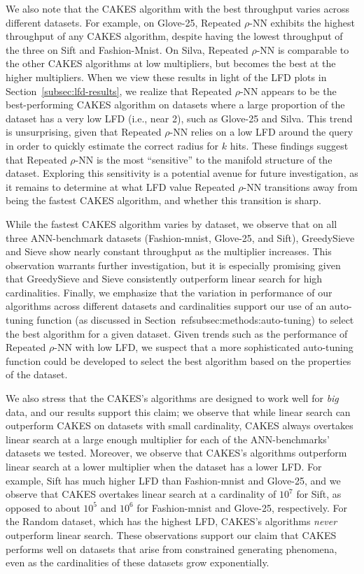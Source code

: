 We also note that the CAKES algorithm with the best throughput varies across different datasets.
For example, on Glove-25, Repeated $\rho$-NN exhibits the highest throughput of any CAKES algorithm, despite having the lowest throughput of the three on Sift and Fashion-Mnist. 
On Silva, Repeated $\rho$-NN is comparable to the other CAKES algorithms at low multipliers, but becomes the best at the higher multipliers. 
When we view these results in light of the LFD plots in Section~\ref{subsec:lfd-results}, we realize that  Repeated $\rho$-NN appears to be the best-performing CAKES algorithm on datasets where a large proportion of the dataset has a very low LFD (i.e., near 2), such as Glove-25 and Silva. 
This trend is unsurprising, given that Repeated $\rho$-NN relies on a low LFD around the query in order to quickly estimate the correct radius for $k$ hits. 
These findings suggest that Repeated $\rho$-NN is the most ``sensitive'' to the manifold structure of the dataset.
Exploring this sensitivity is a potential avenue for future investigation, as it remains to determine at what LFD value Repeated $\rho$-NN transitions away from being the fastest CAKES algorithm, and whether this transition is sharp.

While the fastest CAKES algorithm varies by dataset, we observe that on all three ANN-benchmark datasets (Fashion-mnist, Glove-25, and Sift), GreedySieve and Sieve show nearly constant throughput as the multiplier increases.
This observation warrants further investigation, but it is especially promising given that GreedySieve and Sieve consistently outperform linear search for high cardinalities.
Finally, we emphasize that the variation in performance of our algorithms across different datasets and cardinalities support our use of an auto-tuning function (as discussed in Section~ref{subsec:methods:auto-tuning}) to select the best algorithm for a given dataset.
Given trends such as the performance of Repeated $\rho$-NN with low LFD, we suspect that a more sophisticated auto-tuning function could be developed to select the best algorithm based on the properties of the dataset.

We also stress that the CAKES's algorithms are designed to work well for \emph{big} data, and our results support this claim;
we observe that while linear search can outperform CAKES on datasets with small cardinality, CAKES always overtakes linear search at a large enough multiplier for each of the ANN-benchmarks' datasets we tested.
Moreover, we observe that CAKES's algorithms outperform linear search at a lower multiplier when the dataset has a lower LFD.
For example, Sift has much higher LFD than Fashion-mnist and Glove-25, and we observe that CAKES overtakes linear search at a cardinality of $10^7$ for Sift, as opposed to about $10^5$ and $10^6$ for Fashion-mnist and Glove-25, respectively.
For the Random dataset, which has the highest LFD, CAKES's algorithms \emph{never} outperform linear search.
These observations support our claim that CAKES performs well on datasets that arise from constrained generating phenomena, even as the cardinalities of these datasets grow exponentially.


